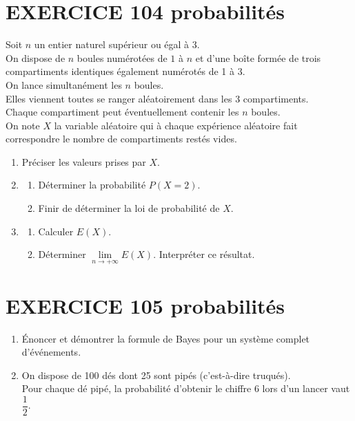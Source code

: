 \documentclass[10pt,oneside]{article}
\begin{document}
\begin{flushleft}
\section*{EXERCICE 104 \:probabilités}
Soit $n$ un entier naturel supérieur ou égal à 3.\\
On dispose de $n$ boules numérotées de $1$ à $n$ et d'une boîte formée de trois compartiments identiques également numérotés de 1 à 3.\\
On lance simultanément les $n$ boules.\\
Elles viennent toutes se ranger aléatoirement dans les  3 compartiments.\\
Chaque compartiment peut éventuellement contenir les $n$ boules.\\
On note $X$ la variable aléatoire qui à chaque expérience aléatoire fait correspondre le nombre de compartiments restés vides.%
\begin{enumerate}
\item
Préciser les valeurs prises par $X$.
\item
\begin{enumerate}
\item
Déterminer la probabilité $P(X=2)$.
\item
Finir de déterminer la loi de probabilité de $X$.
\end{enumerate}
\item
\begin{enumerate}
\item
Calculer $E(X)$.
\item
Déterminer $\lim\limits_{n\to +\infty}^{}E(X)$. Interpréter ce résultat.
\end{enumerate}
\end{enumerate}

\section*{EXERCICE 105 \:probabilités}

\begin{enumerate}
\item
\'Enoncer et démontrer la formule de Bayes pour un système complet d'événements.
\item
On dispose de 100 dés dont 25 sont pipés (c'est-à-dire truqués).\\
Pour chaque dé pipé, la probabilité d'obtenir le chiffre 6 lors d'un lancer vaut $\dfrac{1}{2}$.
\begin{enumerate}



\end{enumerate}
\end{enumerate}
\end{flushleft}
\end{document}
